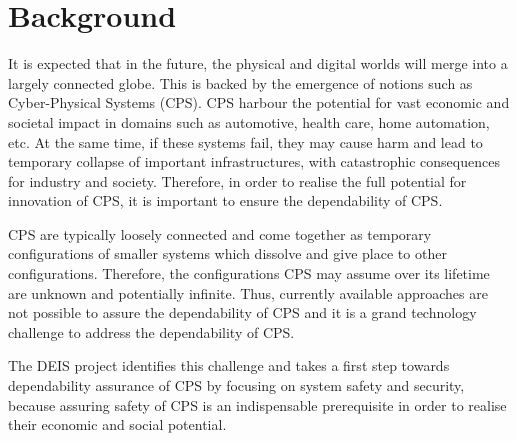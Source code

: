 \section{Background}
It is expected that in the future, the physical and digital worlds will merge into a largely connected globe. This is backed by the emergence of notions such as Cyber-Physical Systems (CPS). 
CPS harbour the potential for vast economic and societal impact in domains such as automotive, health care, home automation, etc. At the same time, if these systems fail, they may cause harm and lead to temporary collapse of important infrastructures, with catastrophic consequences for industry and society. 
Therefore, in order to realise the full potential for innovation of CPS, it is important to ensure the dependability of CPS.

CPS are typically loosely connected and come together as temporary configurations of smaller systems which dissolve and give place to other configurations. Therefore, the configurations CPS may assume over its lifetime are unknown and potentially infinite. Thus, currently available approaches are not possible to assure the dependability of CPS and it is a grand technology challenge to address the dependability of CPS. 

The DEIS project identifies this challenge and takes a first step towards dependability assurance of CPS by focusing on system safety and security, because assuring safety of CPS is an indispensable prerequisite in order to realise their economic and social potential.

